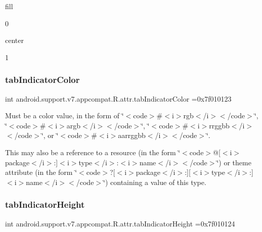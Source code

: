 {\ttfamily fill}

0

{\ttfamily center}

1\mbox{\label{classandroid_1_1support_1_1v7_1_1appcompat_1_1R_1_1attr_a21aa1690b4be79b22f649ba6804cc05f}} 
\subsubsection{\texorpdfstring{tab\+Indicator\+Color}{tabIndicatorColor}}
{\footnotesize\ttfamily int android.\+support.\+v7.\+appcompat.\+R.\+attr.\+tab\+Indicator\+Color =0x7f010123\hspace{0.3cm}{\ttfamily [static]}}

Must be a color value, in the form of \char`\"{}$<$code$>$\#$<$i$>$rgb$<$/i$>$$<$/code$>$\char`\"{}, \char`\"{}$<$code$>$\#$<$i$>$argb$<$/i$>$$<$/code$>$\char`\"{}, \char`\"{}$<$code$>$\#$<$i$>$rrggbb$<$/i$>$$<$/code$>$\char`\"{}, or \char`\"{}$<$code$>$\#$<$i$>$aarrggbb$<$/i$>$$<$/code$>$\char`\"{}. 

This may also be a reference to a resource (in the form \char`\"{}$<$code$>$@\mbox{[}$<$i$>$package$<$/i$>$\+:\mbox{]}$<$i$>$type$<$/i$>$\+:$<$i$>$name$<$/i$>$$<$/code$>$\char`\"{}) or theme attribute (in the form \char`\"{}$<$code$>$?\mbox{[}$<$i$>$package$<$/i$>$\+:\mbox{]}\mbox{[}$<$i$>$type$<$/i$>$\+:\mbox{]}$<$i$>$name$<$/i$>$$<$/code$>$\char`\"{}) containing a value of this type. \mbox{\label{classandroid_1_1support_1_1v7_1_1appcompat_1_1R_1_1attr_a0f9821181dbe0b7ee51ea0d5d79317ba}} 
\subsubsection{\texorpdfstring{tab\+Indicator\+Height}{tabIndicatorHeight}}
{\footnotesize\ttfamily int android.\+support.\+v7.\+appcompat.\+R.\+attr.\+tab\+Indicator\+Height =0x7f010124\hspace{0.3cm}{\ttfamily [static]}}

